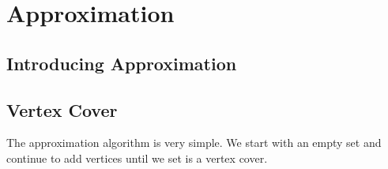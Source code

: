 
\chapter{Approximation}





\section{Introducing Approximation}



\section{Vertex Cover}

The approximation algorithm is very simple. 
We start with an empty set and continue to add 
vertices until we set is a vertex cover. 

